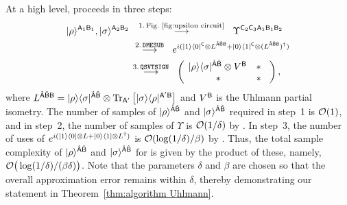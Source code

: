 At a high level,  proceeds in three steps:
\begin{align}
\ket{\rho}^{\sA_1\sB_1}, \ket{\sigma}^{\sA_2\sB_2}
&\hspace{0.6pc}\overset{1. \, \text{Fig.~\ref{fig:upsilon circuit}}}{\longrightarrow}\hspace{0.5pc}
\Upsilon^{\sC_2\sC_3\sA_1\sB_1\sB_2} \\
&\hspace{0.3pc}\overset{2. \, \mathtt{DMESUB}}{\longrightarrow}\hspace{0.5pc}
e^{i(\ketbra{1}{0}^\sC \otimes L^{\hat{\sA}\hat{\sB}\sB} + \ketbra{0}{1}^\sC\otimes (L^{\hat{\sA}\hat{\sB}\sB})^\dag)} \\
&\hspace{0.1pc}\overset{3. \, \mathtt{QSVTSIGN}}{\longrightarrow}\hspace{0.5pc}
\begin{pmatrix}
    \hspace*{1.5mm} \ketbra{\rho}{\sigma}^{\hat{\sA}\hat{\sB}} \otimes V^\sB & \hspace*{0mm} * \hspace*{3mm} \\
    \hspace*{2mm} * & \hspace{0mm} * \hspace*{3mm}
\end{pmatrix},
\end{align}
where $L^{\hat{{\mathsf{A}}}\hat{{\mathsf{B}}}{\mathsf{B}}} = |\rho\rangle\langle\sigma|^{\hat{{\mathsf{A}}}\hat{{\mathsf{B}}}}\otimes\operatorname{Tr}_{{\mathsf{A}}'}\big[|\sigma\rangle\langle\rho|^{{\mathsf{A}}'{\mathsf{B}}}\big]$ and $V^{\mathsf{B}}$ is the Uhlmann partial isometry.
The number of samples of $|\rho\rangle^{\hat{{\mathsf{A}}}\hat{{\mathsf{B}}}}$ and $|\sigma\rangle^{\hat{{\mathsf{A}}}\hat{{\mathsf{B}}}}$ required in step~1 is ${\mathcal{O}}(1)$, and in step~2, the number of samples of $\Upsilon$ is ${\mathcal{O}}(1/\delta)$ by . In step~3, the number of uses of $e^{i(|1\rangle\langle0| \otimes L + |0\rangle\langle1|\otimes L^\dag)}$ is ${\mathcal{O}}(\log(1/\delta)/\beta)$ by .  
Thus, the total sample complexity of $|\rho\rangle^{\hat{{\mathsf{A}}}\hat{{\mathsf{B}}}}$ and $|\sigma\rangle^{\hat{{\mathsf{A}}}\hat{{\mathsf{B}}}}$ for  is given by the product of these, namely, ${\mathcal{O}}\big(\log(1/\delta)/(\beta\delta)\big)$.  
Note that the parameters $\delta$ and $\beta$ are chosen so that the overall approximation error remains within $\delta$, thereby demonstrating our statement in Theorem~\ref{thm:algorithm Uhlmann}.




